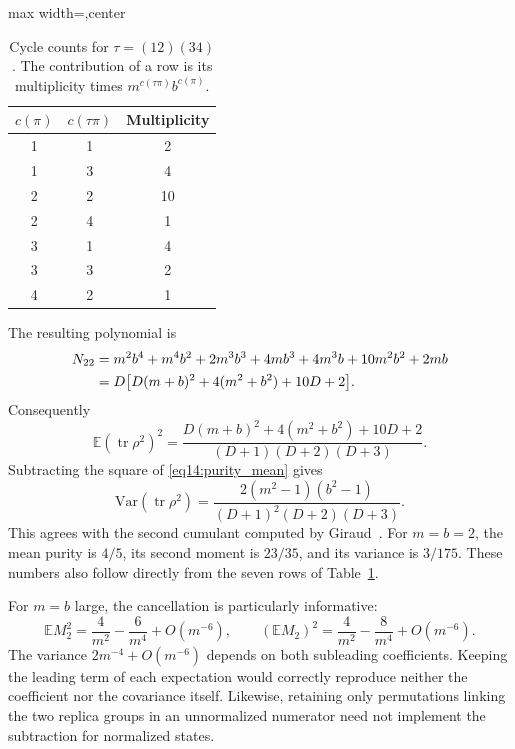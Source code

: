 \documentclass[11pt,letterpaper]{article}
\theoremstyle{plain}
\theoremstyle{definition}
\theoremstyle{remark}
\newcommand{\E}{\mathbb{E}}
\newcommand{\Var}{\text{Var}}
\DeclareMathOperator{\tr}{tr}
\begin{document}
\begin{table}[htbp]
 \centering
 \caption{Cycle counts for $\tau=(12)(34)$.  The contribution of a
 row is its multiplicity times $m^{c(\tau\pi)}b^{c(\pi)}$.}
 \label{tab14:permutation_counts}
 \begin{adjustbox}{max width=\textwidth,center}
 \begin{tabular}{ccc}
 \toprule
 $c(\pi)$ & $c(\tau\pi)$ & Multiplicity\\
 \midrule
 1&1&2\\
 1&3&4\\
 2&2&10\\
 2&4&1\\
 3&1&4\\
 3&3&2\\
 4&2&1\\
 \bottomrule
 \end{tabular}
 \end{adjustbox}
\end{table}

The resulting polynomial is
\begin{align}
 N_{22}
 &=m^2b^4+m^4b^2+2m^3b^3+4mb^3+4m^3b+10m^2b^2+2mb
 \notag\\
 &=D\bigl[D(m+b)^2+4(m^2+b^2)+10D+2\bigr].
 \label{eq14:purity_second_numerator}
\end{align}
Consequently
\begin{equation}
 \E(\tr\rho^2)^2
 =\frac{D(m+b)^2+4(m^2+b^2)+10D+2}
 {(D+1)(D+2)(D+3)}.
 \label{eq14:purity_second_moment}
\end{equation}
Subtracting the square of \eqref{eq14:purity_mean} gives
\begin{equation}
 \Var(\tr\rho^2)
 =\frac{2(m^2-1)(b^2-1)}{(D+1)^2(D+2)(D+3)}.
 \label{eq14:purity_variance}
\end{equation}
This agrees with the second cumulant computed by
Giraud~\citep{giraud2007}.  For $m=b=2$, the mean purity is $4/5$, its
second moment is $23/35$, and its variance is $3/175$.  These numbers
also follow directly from the seven rows of
Table~\ref{tab14:permutation_counts}.

For $m=b$ large, the cancellation is particularly informative:
\begin{equation}
 \E M_2^2=\frac{4}{m^2}-\frac{6}{m^4}+O(m^{-6}),\qquad
 (\E M_2)^2=\frac{4}{m^2}-\frac{8}{m^4}+O(m^{-6}).
 \label{eq14:balanced_expansion}
\end{equation}
The variance $2m^{-4}+O(m^{-6})$ depends on both subleading
coefficients.  Keeping the leading term of each expectation would
correctly reproduce neither the coefficient nor the covariance itself.
Likewise, retaining only permutations linking the two replica groups
in an unnormalized numerator need not implement the subtraction for
normalized states.
\end{document}
